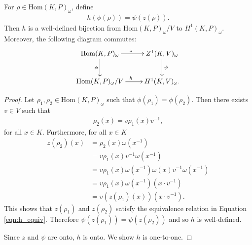 \begin{lemma} \label{maph}
For $\rho \in \mathrm{Hom}(K, P)_\omega$, define
\begin{align*}
h(\phi( \rho)) = \psi(z(\rho)).
\end{align*}
Then $h$ is a well-defined bijection from $\mathrm{Hom}(K, P)_\omega / V$ to $H^1(K, P)_\omega$. Moreover, the following diagram commutes:
  \begin{align*}
    \xymatrix{
    \mathrm{Hom}(K, P)_{\omega} \ar[r]^z \ar[d]_\phi & Z^{1}(K, V)_\omega \ar[d]^\psi \\
    \mathrm{Hom}(K, P)_{\omega}/V \ar[r]^h & H^{1}(K, V)_\omega.
    }
  \end{align*}
  \label{lem:v_h1}
\end{lemma}
\begin{proof}  
Let $\rho_1, \rho_2 \in \mathrm{Hom}(K, P)_\omega$ such that $\phi(\rho_1) = \phi(\rho_2)$. Then there exists $v \in V$ such that
\begin{align*} \rho_2(x) =  v\rho_1(x)v^{-1}, \end{align*}
for all $x \in K$. Furthermore, for all $x \in K$
\begin{align*}
z(\rho_2)(x) %
&= \rho_2(x)\omega(x^{-1}) \\
&= v \rho_1(x) v^{-1} \omega(x^{-1}) \\
&= v \rho_1(x) \omega(x^{-1})\omega(x) v^{-1} \omega(x^{-1}) \\
&= v \rho_1(x) \omega(x^{-1}) \left(x \cdot v^{-1}\right) \\
&= v \left(z(\rho_1)(x)\right) \left(x \cdot v^{-1}\right).
\end{align*}
This shows that $z(\rho_1)$ and $z(\rho_2)$ satisfy the equivalence relation in Equation \ref{eqn:h_equiv}. Therefore $\psi\left(z(\rho_1)\right) = \psi\left(z(\rho_2)\right)$ and so $h$ is well-defined.

Since $z$ and $\psi$ are onto, $h$ is onto. We show $h$ is one-to-one.


\end{proof}
